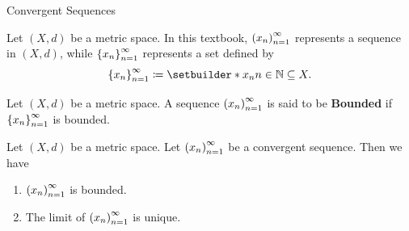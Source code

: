 \begin{section}{Convergent Sequences}
\bigskip

\begin{remark}
    Let $(X, d)$ be a metric space. In this textbook, $\paren*{x_{n}}_{n = 1}^{\infty}$ represents
    a sequence in $(X, d)$, while $\set*{x_{n}}_{n = 1}^{\infty}$ represents a set defined by
    \[
    \set*{x_{n}}_{n = 1}^{\infty} \coloneqq \setbuilder*{x_{n}}{n \in \N} \subseteq X.
    \]
\end{remark}

\bigskip

\begin{definition} \label{def:BoundedSequence}
    Let $(X, d)$ be a metric space. A sequence $\paren*{x_{n}}_{n = 1}^{\infty}$
    is said to be \textbf{Bounded} if $\set*{x_{n}}_{n = 1}^{\infty}$ is bounded.
\end{definition}

\bigskip

\begin{theorem} \label{thm:ConvergentSequenceIsBounded}
    Let $(X, d)$ be a metric space. Let $\paren*{x_{n}}_{n = 1}^{\infty}$ be a convergent sequence. Then we have
    \begin{enumerate}[label=\textbf{(\Alph*)}]
        \item $\paren*{x_{n}}_{n = 1}^{\infty}$ is bounded.
        \item The limit of $\paren*{x_{n}}_{n = 1}^{\infty}$ is unique.
    \end{enumerate}
\end{theorem}


\end{section}

